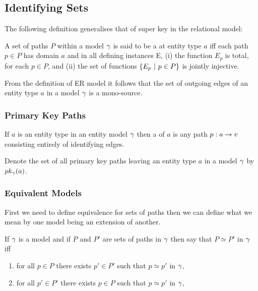 \subsection{Identifying Sets}

The following definition generalises that of super key in the relational model:
\begin{definition}
A set of paths $P$  within a model $\gamma$ is said to be a  at entity type $a$
iff each path $p \in P$ has domain $a$ and  in all defining instances E, 
(i) the function $E_p$ is total, for each $p \in P$, and (ii) the set of functions
$\left\{E_p \ \middle|\ p\in P\right\}$ is jointly injective.
\end{definition}

From the definition of ER model it follows that the set of outgoing edges of an entity type 
$a$ in a model $\gamma$ is a mono-source. 
\subsubsection{Primary Key Paths}
\begin{definition}
If $a$ is an entity type in an entity model $\gamma$ then a 
of $a$ is any path $p:a \rightarrow v$ consisting entirely of identifying edges. 
\end{definition}

Denote the set of all primary key paths leaving an entity type $a$ in a model $\gamma$ by 
$pk_{\gamma}(a)$.

\subsubsection{Equivalent Models}

First we need to define equivalence for sets of paths then we can define what we mean by 
one model being an extension of another.
\begin{definition}
If $\gamma$ is a model and if $P$ and $P'$ are sets of paths in $\gamma$ then say that
$P \simeq P'$ in $\gamma$ iff
\begin{enumerate}
\item for all $p \in P$ there exists $p' \in P'$ such that $p \simeq p'$ in $\gamma$,
\item for all $p' \in P'$ there exists $p \in P$ such that $p \simeq p'$ in $\gamma$,
\end{enumerate} 
\end{definition}

